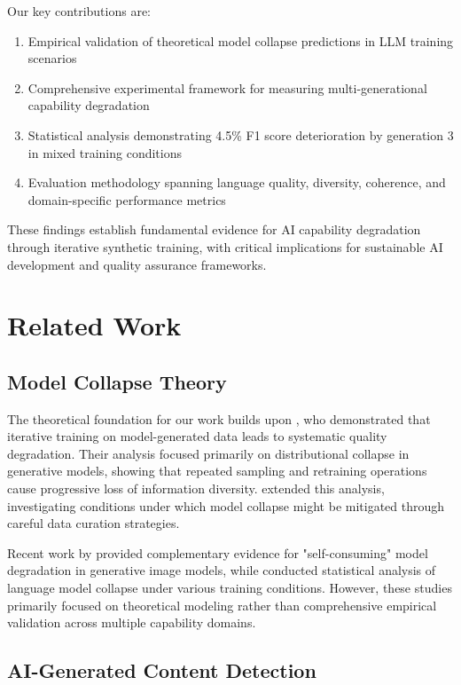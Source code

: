 \documentclass{article}
\begin{document}
Our key contributions are:
\begin{enumerate}
\item Empirical validation of theoretical model collapse predictions in LLM training scenarios
\item Comprehensive experimental framework for measuring multi-generational capability degradation
\item Statistical analysis demonstrating 4.5\% F1 score deterioration by generation 3 in mixed training conditions
\item Evaluation methodology spanning language quality, diversity, coherence, and domain-specific performance metrics
\end{enumerate}

These findings establish fundamental evidence for AI capability degradation through iterative synthetic training, with critical implications for sustainable AI development and quality assurance frameworks.

\section{Related Work}

\subsection{Model Collapse Theory}

The theoretical foundation for our work builds upon \citet{shumailov2023curse}, who demonstrated that iterative training on model-generated data leads to systematic quality degradation. Their analysis focused primarily on distributional collapse in generative models, showing that repeated sampling and retraining operations cause progressive loss of information diversity. \citet{gerstgrasser2024model} extended this analysis, investigating conditions under which model collapse might be mitigated through careful data curation strategies.

Recent work by \citet{alemohammad2023self} provided complementary evidence for "self-consuming" model degradation in generative image models, while \citet{seddik2024bad} conducted statistical analysis of language model collapse under various training conditions. However, these studies primarily focused on theoretical modeling rather than comprehensive empirical validation across multiple capability domains.

\subsection{AI-Generated Content Detection}
\end{document}
